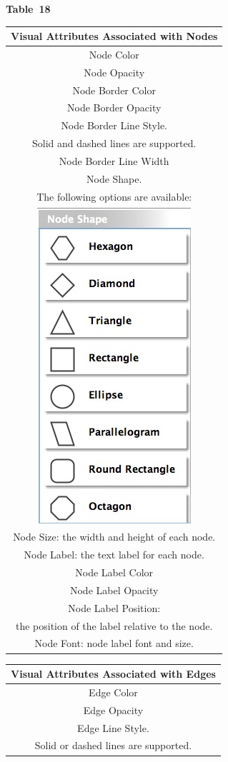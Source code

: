 \textbf{Table 18}\\
\begin{center}
\begin{tabular}{|c|}
\hline
 \textbf{Visual Attributes Associated with Nodes} \\
\hline
 Node Color \\
\hline
 Node Opacity \\
\hline
 Node Border Color \\
\hline
 Node Border Opacity \\
\hline
 Node Border Line Style. \\
Solid and dashed lines are supported.  \\
\hline
 Node Border Line Width \\
\hline
 Node Shape. \\The following options are available: \\
\hline
 \includegraphics[width=.2\textwidth]{images/NewVizMapperNodeShape.png} \\
\hline
 Node Size: the width and height of each node.  \\
\hline
 Node Label: the text label for each node.  \\
\hline
 Node Label Color \\
\hline
 Node Label Opacity \\
\hline
 Node Label Position:\\ the position of the label relative to the node.  \\
\hline
 Node Font: node label font and size. \\
 \hline 
\end{tabular}
\begin{tabular}{|c|}
\hline 
\textbf{Visual Attributes Associated with Edges}\\
\hline 
Edge Color \\
\hline 
Edge Opacity \\
\hline 
Edge Line Style.\\ Solid or dashed lines are supported.\\

\end{tabular}
\end{center}

